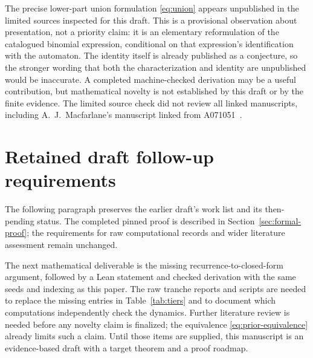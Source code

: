 \documentclass[11pt]{article}
\begin{document}
The precise lower-part union formulation \eqref{eq:union} appears
unpublished in the limited sources inspected for this draft. This is a
provisional observation about presentation, not a priority claim: it is an
elementary reformulation of the catalogued binomial expression, conditional
on that expression's identification with the automaton. The identity
itself is already published as a conjecture, so the stronger wording that
both the characterization and identity are unpublished would be
inaccurate. A completed machine-checked derivation may be a useful
contribution, but mathematical novelty is not established by this draft or
by the finite evidence. The limited source check did not review all linked
manuscripts, including A.\ J.\ Macfarlane's manuscript linked from
A071051~\cite{oeis071051}.

\section{Retained draft follow-up requirements}

The following paragraph preserves the earlier draft's work list and its
then-pending status. The completed pinned proof is described in
Section~\ref{sec:formal-proof}; the requirements for raw computational
records and wider literature assessment remain unchanged.

The next mathematical deliverable is the missing recurrence-to-closed-form
argument, followed by a Lean statement and checked derivation with the
same seeds and indexing as this paper. The raw tranche reports and scripts
are needed to replace the missing entries in Table~\ref{tab:tiers} and to
document which computations independently check the dynamics. Further
literature review is needed before any novelty claim is finalized; the
equivalence \eqref{eq:prior-equivalence} already limits such a claim.
Until those items are supplied, this manuscript is an
evidence-based draft with a target theorem and a proof roadmap.
\end{document}
